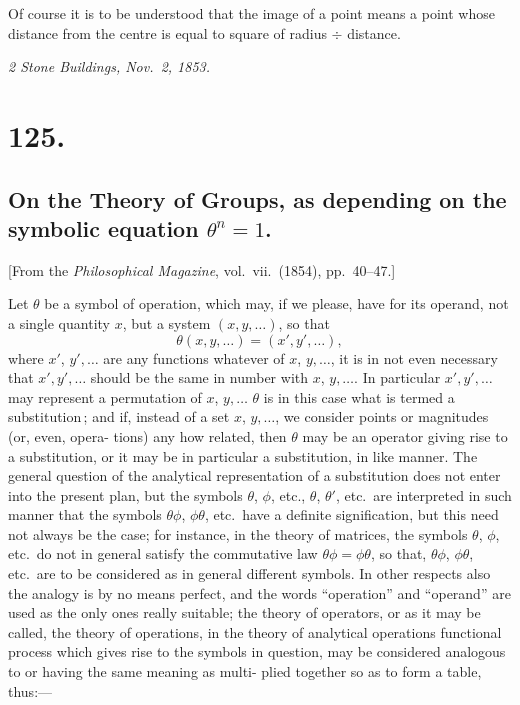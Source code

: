 \documentclass[11pt,a4paper]{article}
\theoremstyle{definition}
\begin{document}
\smallskip

Of course it is to be understood that the image of a point means a point whose
distance from the centre is equal to square of radius $\div$ distance.

\medskip
\noindent\textit{2 Stone Buildings, Nov.\ 2, 1853.}

\section*{125.}
\subsection*{On the Theory of Groups, as depending on the symbolic equation $\theta^n=1$.}

[From the \textit{Philosophical Magazine}, vol.\ vii.\ (1854), pp.\ 40--47.]

\medskip

Let $\theta$ be a symbol of operation, which may, if we please, have for its operand,
not a single quantity $x$, but a system $(x, y,\ldots)$, so that
\[
\theta(x, y,\ldots) = (x', y',\ldots),
\]
where $x'$, $y',\ldots$ are any functions whatever of $x$, $y,\ldots$, it is in not even necessary that
$x', y',\ldots$ should be the same in number with $x$, $y,\ldots$. In particular $x', y',\ldots$ may
represent a permutation of $x$, $y,\ldots$ $\theta$ is in this case what is termed a substitution\,;
and if, instead of a set $x$, $y,\ldots$, we consider points or magnitudes (or, even, opera-
tions) any how related, then $\theta$ may be an operator giving rise to a substitution, or it
may be in particular a substitution, in like manner. The general question of the
analytical representation of a substitution does not enter into the present plan, but
the symbols $\theta$, $\phi$, etc., $\theta$, $\theta'$, etc.\ are interpreted in such manner that the symbols
$\theta\phi$, $\phi\theta$, etc.\ have a definite signification, but this need not always be the case; for
instance, in the theory of matrices, the symbols $\theta$, $\phi$, etc.\ do not in general satisfy
the commutative law $\theta\phi=\phi\theta$, so that, $\theta\phi$, $\phi\theta$, etc.\ are to be considered as in general
different symbols. In other respects also the analogy is by no means perfect, and
the words ``operation'' and ``operand'' are used as the only ones really suitable; the
theory of operators, or as it may be called, the theory of operations, in the
theory of analytical operations functional process which gives rise to the symbols
in question, may be considered analogous to or having the same meaning as multi-
plied together so as to form a table, thus:---
\end{document}
